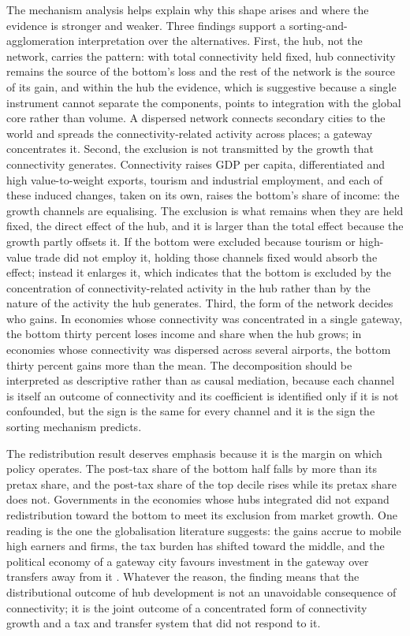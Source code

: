 The mechanism analysis helps explain why this shape arises and where the evidence is stronger and weaker. Three findings support a sorting-and-agglomeration interpretation over the alternatives. First, the hub, not the network, carries the pattern: with total connectivity held fixed, hub connectivity remains the source of the bottom's loss and the rest of the network is the source of its gain, and within the hub the evidence, which is suggestive because a single instrument cannot separate the components, points to integration with the global core rather than volume. A dispersed network connects secondary cities to the world and spreads the connectivity-related activity across places; a gateway concentrates it. Second, the exclusion is not transmitted by the growth that connectivity generates. Connectivity raises GDP per capita, differentiated and high value-to-weight exports, tourism and industrial employment, and each of these induced changes, taken on its own, raises the bottom's share of income: the growth channels are equalising. The exclusion is what remains when they are held fixed, the direct effect of the hub, and it is larger than the total effect because the growth partly offsets it. If the bottom were excluded because tourism or high-value trade did not employ it, holding those channels fixed would absorb the effect; instead it enlarges it, which indicates that the bottom is excluded by the concentration of connectivity-related activity in the hub rather than by the nature of the activity the hub generates. Third, the form of the network decides who gains. In economies whose connectivity was concentrated in a single gateway, the bottom thirty percent loses income and share when the hub grows; in economies whose connectivity was dispersed across several airports, the bottom thirty percent gains more than the mean. The decomposition should be interpreted as descriptive rather than as causal mediation, because each channel is itself an outcome of connectivity and its coefficient is identified only if it is not confounded, but the sign is the same for every channel and it is the sign the sorting mechanism predicts.

The redistribution result deserves emphasis because it is the margin on which policy operates. The post-tax share of the bottom half falls by more than its pretax share, and the post-tax share of the top decile rises while its pretax share does not. Governments in the economies whose hubs integrated did not expand redistribution toward the bottom to meet its exclusion from market growth. One reading is the one the globalisation literature suggests: the gains accrue to mobile high earners and firms, the tax burden has shifted toward the middle, and the political economy of a gateway city favours investment in the gateway over transfers away from it \citep{Egger_2019,Kleven_2013}. Whatever the reason, the finding means that the distributional outcome of hub development is not an unavoidable consequence of connectivity; it is the joint outcome of a concentrated form of connectivity growth and a tax and transfer system that did not respond to it.

